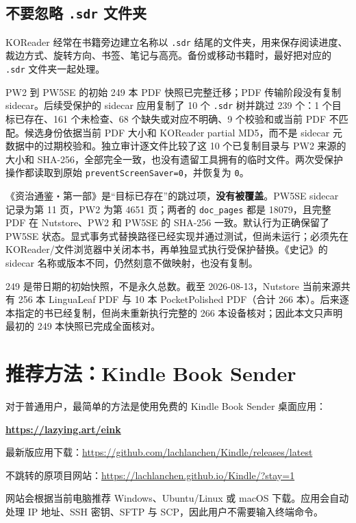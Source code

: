 \documentclass[10pt,a4paper]{article}
\begin{document}
\subsection{不要忽略 \texttt{.sdr} 文件夹}

KOReader 经常在书籍旁边建立名称以 \texttt{.sdr} 结尾的文件夹，用来保存阅读进度、裁边方式、旋转方向、书签、笔记与高亮。备份或移动书籍时，最好把对应的 \texttt{.sdr} 文件夹一起处理。

PW2 到 PW5SE 的初始 249 本 PDF 快照已完整迁移；PDF 传输阶段没有复制 sidecar。后续受保护的 sidecar 应用复制了 10 个 \texttt{.sdr} 树并跳过 239 个：1 个目标已存在、161 个未检查、68 个缺失或对应不明确、9 个校验和或当前 PDF 不匹配。候选身份依据当前 PDF 大小和 KOReader partial MD5，而不是 sidecar 元数据中的过期校验和。独立审计逐文件比较了这 10 个已复制目录与 PW2 来源的大小和 SHA-256，全部完全一致，也没有遗留工具拥有的临时文件。两次受保护操作都读取到原始 \texttt{preventScreenSaver=0}，并恢复为 \texttt{0}。

《资治通鉴・第一部》是“目标已存在”的跳过项，\textbf{没有被覆盖}。PW5SE sidecar 记录为第 11 页，PW2 为第 4651 页；两者的 \texttt{doc\_pages} 都是 18079，且完整 PDF 在 Nutstore、PW2 和 PW5SE 的 SHA-256 一致。默认行为正确保留了 PW5SE 状态。显式事务式替换路径已经实现并通过测试，但尚未运行；必须先在 KOReader/文件浏览器中关闭本书，再单独显式执行受保护替换。《史记》的 sidecar 名称或版本不同，仍然刻意不做映射，也没有复制。

249 是带日期的初始快照，不是永久总数。截至 2026-08-13，Nutstore 当前来源共有 256 本 LinguaLeaf PDF 与 10 本 PocketPolished PDF（合计 266 本）。后来逐本指定的书已经复制，但尚未重新执行完整的 266 本设备核对；因此本文只声明最初的 249 本快照已完成全面核对。

\section{推荐方法：Kindle Book Sender}

对于普通用户，最简单的方法是使用免费的 Kindle Book Sender 桌面应用：

\begin{center}
\href{https://lazying.art/eink}{\textbf{https://lazying.art/eink}}

最新版应用下载：\url{https://github.com/lachlanchen/Kindle/releases/latest}

不跳转的原项目网站：\url{https://lachlanchen.github.io/Kindle/?stay=1}
\end{center}

网站会根据当前电脑推荐 Windows、Ubuntu/Linux 或 macOS 下载。应用会自动处理 IP 地址、SSH 密钥、SFTP 与 SCP，因此用户不需要输入终端命令。
\end{document}
